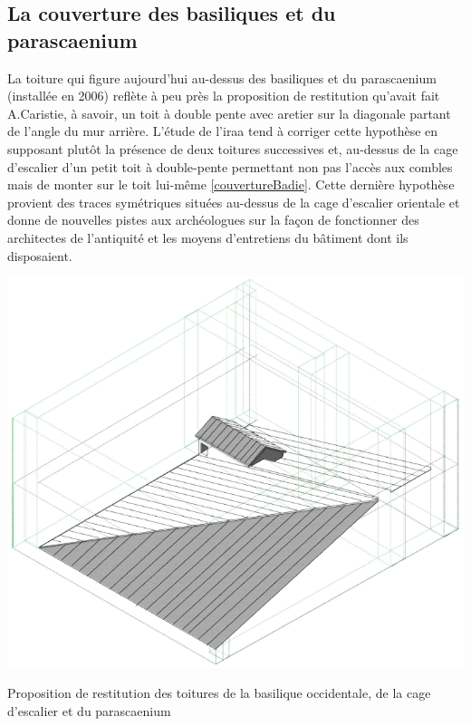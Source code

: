 	\subsection{La couverture des \glspl{basilique} et du \gls{parascaenium}}
		
		La toiture qui figure aujourd'hui au-dessus des \glspl{basilique} et du \gls{parascaenium} (installée en 2006) reflète à peu près la proposition de restitution qu'avait fait A.Caristie, à savoir, un toit à double pente avec \gls{aretier} sur la diagonale partant de l'angle du mur arrière. L'étude de l'\gls{iraa} tend à corriger cette hypothèse en supposant plutôt la présence de deux toitures successives et, au-dessus de la cage d’escalier d’un petit toit à double-pente permettant non pas l’accès aux combles mais de monter sur le toit lui-même \ref{couvertureBadie}. Cette dernière hypothèse provient des traces symétriques situées au-dessus de la cage d’escalier orientale et donne de nouvelles pistes aux archéologues sur la façon de fonctionner des architectes de l'antiquité et les moyens d'entretiens du bâtiment dont ils disposaient. 
		
		\begin{figureth}
			\includegraphics[width=\linewidth]{images/couvertureBadie}
			\caption[Toitures de basiliques par A.Badie]{Proposition de restitution des toitures de la \gls{basilique} occidentale, de la cage d'escalier et du \gls{parascaenium} \cite[Pl. XLVII]{orangePl}}
			\label{couvertureBadie}
		\end{figureth}	

